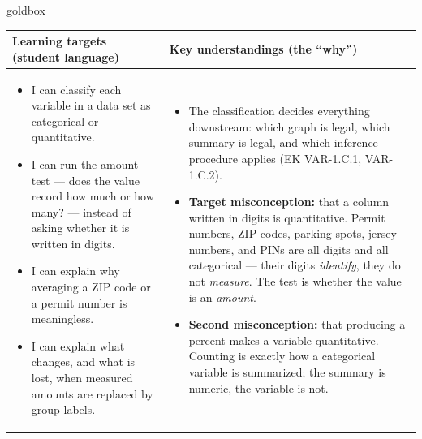 \documentclass[10pt]{article}
\begin{document}
\renewcommand{\arraystretch}{1.4}
\boxguard
\begin{skillbox}{goldbox}
\begin{tabularx}{\linewidth}{@{}X|X@{}}
\textbf{Learning targets (student language)} & \textbf{Key understandings (the ``why'')} \\[2pt]
\hline
\vspace{-6pt}
\begin{itemize}[leftmargin=1.1em, nosep, after=\vspace{2pt}]
  \item I can classify each variable in a data set as categorical or quantitative.
  \item I can run the amount test --- does the value record how much or how many? --- instead
        of asking whether it is written in digits.
  \item I can explain why averaging a ZIP code or a permit number is meaningless.
  \item I can explain what changes, and what is lost, when measured amounts are replaced by
        group labels.
\end{itemize}
&
\vspace{-6pt}
\begin{itemize}[leftmargin=1.1em, nosep, after=\vspace{2pt}]
  \item The classification decides everything downstream: which graph is legal, which summary
        is legal, and which inference procedure applies (EK VAR-1.C.1, VAR-1.C.2).
  \item \textbf{Target misconception:} that a column written in digits is quantitative.
        Permit numbers, ZIP codes, parking spots, jersey numbers, and PINs are all digits and
        all categorical --- their digits \emph{identify}, they do not \emph{measure}. The test
        is whether the value is an \emph{amount}.
  \item \textbf{Second misconception:} that producing a percent makes a variable quantitative.
        Counting is exactly how a categorical variable is summarized; the summary is numeric,
        the variable is not.
\end{itemize}
\end{tabularx}
\end{skillbox}
\end{document}
